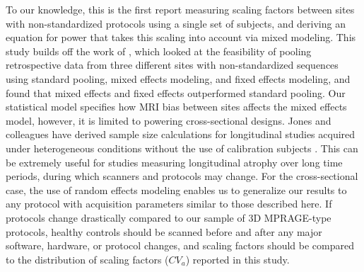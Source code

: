 To our knowledge, this is the first report measuring scaling factors between sites with non-standardized protocols using a single set of subjects, and deriving an equation for power that takes this scaling into account via mixed modeling. This study builds off the work of \cite{fennema2007feasibility}, which looked at the feasibility of pooling retrospective data from three different sites with non-standardized sequences using standard pooling, mixed effects modeling, and fixed effects modeling, and found that mixed effects and fixed effects outperformed standard pooling. Our statistical model specifies how MRI bias between sites affects the mixed effects model, however, it is limited to powering cross-sectional designs. Jones and colleagues have derived sample size calculations for longitudinal studies acquired under heterogeneous conditions without the use of calibration subjects \cite{jones2013quantification}. This can be extremely useful for studies measuring longitudinal atrophy over long time periods, during which scanners and protocols may change. For the cross-sectional case, the use of random effects modeling enables us to generalize our results to any protocol with acquisition parameters similar to those described here. If protocols change drastically compared to our sample of 3D MPRAGE-type protocols, healthy controls should be scanned before and after any major software, hardware, or protocol changes, and scaling factors should be compared to the distribution of scaling factors ($CV_a$) reported in this study.